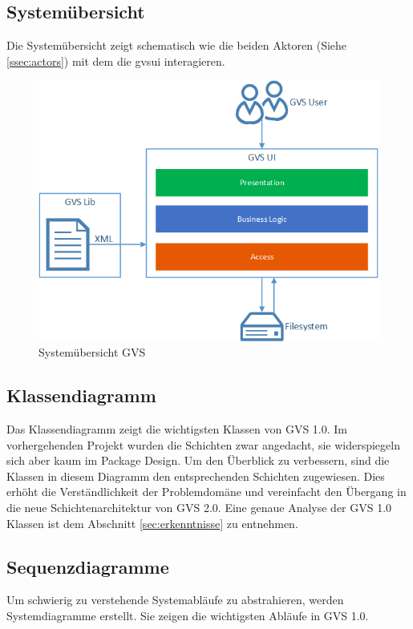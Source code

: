 \documentclass[11pt,a4paper,english,oneside]{book}
\numberwithin{equation}{chapter}
\begin{document}
	\subsection{Systemübersicht}
	Die Systemübersicht zeigt schematisch wie die beiden Aktoren (Siehe \ref{ssec:actors}) mit dem  die \gls{gvsui} interagieren.
	
	\begin{figure}[h!]
		\centering
		\includegraphics[width=0.5\linewidth]{assets/images/system_overview}
		\caption{Systemübersicht GVS}
		\label{fig:gvs-systemuebersicht}
	\end{figure}
	
	\subsection{Klassendiagramm} \label{ssec:klassendiagramm-1}
	Das Klassendiagramm zeigt die wichtigsten Klassen von GVS 1.0. Im vorhergehenden Projekt wurden die Schichten zwar angedacht, sie widerspiegeln sich aber kaum im Package Design. Um den Überblick zu verbessern, sind die Klassen in diesem Diagramm den entsprechenden Schichten zugewiesen. Dies erhöht die Verständlichkeit der Problemdomäne und vereinfacht den Übergang in die neue Schichtenarchitektur von GVS 2.0. Eine genaue Analyse der GVS 1.0 Klassen ist dem Abschnitt \ref{sec:erkenntnisse} zu entnehmen. 
	
	
		
	\subsection{Sequenzdiagramme}
	Um schwierig zu verstehende Systemabläufe zu abstrahieren, werden Systemdiagramme erstellt. Sie zeigen die wichtigsten Abläufe in GVS 1.0.
	
\end{document}

